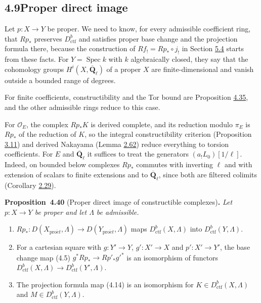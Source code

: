 \documentclass[11pt]{article}
\newenvironment{bpstatement}[2]{\par\addvspace{0.6\baselineskip}\noindent\textbf{#1}#2\textbf{.}\enspace\ignorespaces}
  {\par\addvspace{0.4\baselineskip}}
\newenvironment{bpstatementit}[2]{\begin{bpstatement}{#1}{#2}\itshape\ignorespaces}{\end{bpstatement}}
\begin{document}
\subsection*{\texorpdfstring{4.9\quad Proper direct image}{4.9 Proper direct image}}
\label{bp403}%
\label{bp404}%
Let \(p:X\to Y\) be proper. We need to know, for every admissible coefficient ring, that \(Rp_*\) preserves \(D^b_{\mathrm{ctf}}\) and satisfies proper base change and the projection formula there, because the construction of \(Rf_!=Rp_*\circ j_!\) in Section \hyperref[bp459]{5.4} starts from these facts. For \(Y=\operatorname{Spec}k\) with \(k\) algebraically closed, they say that the cohomology groups \(H^i(X,\overline{\mathbf Q}_\ell)\) of a proper \(X\) are finite-dimensional and vanish outside a bounded range of degrees.

For finite coefficients, constructibility and the Tor bound are Proposition \hyperref[bp390]{4.35}, and the other admissible rings reduce to this case.

For \(\mathcal O_E\), the complex \(Rp_*K\) is derived complete, and its reduction modulo \(\pi_E\) is \(Rp_*\) of the reduction of \(K\), so the integral constructibility criterion (Proposition \hyperref[bp226]{3.11}) and derived Nakayama (Lemma \hyperref[bp190]{2.62}) reduce everything to torsion coefficients. For \(E\) and \(\overline{\mathbf Q}_\ell\) it suffices to treat the generators \((a_!L_0)[1/\ell]\). Indeed, on bounded below complexes \(Rp_*\) commutes with inverting \(\ell\) and with extension of scalars to finite extensions and to \(\overline{\mathbf Q}_\ell\), since both are filtered colimits (Corollary \hyperref[bp86]{2.29}).

\label{bp405}%
\begin{bpstatementit}{Proposition~4.40}{ (Proper direct image of constructible complexes)}
Let \(p:X\to Y\) be proper and let \(\Lambda\) be admissible.

\begin{enumerate}
\item \(Rp_*:D(X_{\mathrm{pro}\acute{e}t},\Lambda)\to D(Y_{\mathrm{pro}\acute{e}t},\Lambda)\) maps \(D^b_{\mathrm{ctf}}(X,\Lambda)\) into \(D^b_{\mathrm{ctf}}(Y,\Lambda)\).
\item For a cartesian square with \(g:Y'\to Y\), \(g':X'\to X\) and \(p':X'\to Y'\), the base change map (4.5) \(g^*Rp_*\to Rp'_*g'^*\) is an isomorphism of functors \(D^b_{\mathrm{ctf}}(X,\Lambda)\to D^b_{\mathrm{ctf}}(Y',\Lambda)\).
\item The projection formula map (4.14) is an isomorphism for \(K\in D^b_{\mathrm{ctf}}(X,\Lambda)\) and \(M\in D^b_{\mathrm{ctf}}(Y,\Lambda)\).
\end{enumerate}
\end{bpstatementit}
\end{document}
